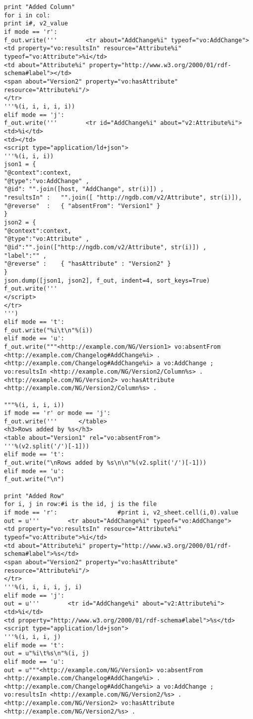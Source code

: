 \begin{verbatim}
print "Added Column"
for i in col:
print i#, v2_value
if mode == 'r':
f_out.write('''        <tr about="AddChange%i" typeof="vo:AddChange">
<td property="vo:resultsIn" resource="Attribute%i" typeof="vo:Attribute">%i</td>
<td about="Attribute%i" property="http://www.w3.org/2000/01/rdf-schema#label"></td>
<span about="Version2" property="vo:hasAttribute" resource="Attribute%i"/>
</tr>
'''%(i, i, i, i, i))
elif mode == 'j':
f_out.write('''        <tr id="AddChange%i" about="v2:Attribute%i">
<td>%i</td>
<td></td>
<script type="application/ld+json">
'''%(i, i, i))
json1 = {
"@context":context,
"@type":"vo:AddChange" ,
"@id": "".join([host, "AddChange", str(i)]) ,
"resultsIn" :   "".join([ "http://ngdb.com/v2/Attribute", str(i)]),
"@reverse"  :   { "absentFrom": "Version1" }
}
json2 = {
"@context":context,
"@type":"vo:Attribute" ,
"@id":"".join(["http://ngdb.com/v2/Attribute", str(i)]) ,
"label":"" ,
"@reverse" :    { "hasAttribute" : "Version2" }
}
json.dump([json1, json2], f_out, indent=4, sort_keys=True)
f_out.write('''
</script>
</tr>
''')
elif mode == 't':
f_out.write("%i\t\n"%(i))	
elif mode == 'u':
f_out.write("""<http://example.com/NG/Version1> vo:absentFrom <http://example.com/Changelog#AddChange%i> .
<http://example.com/Changelog#AddChange%i> a vo:AddChange ;
vo:resultsIn <http://example.com/NG/Version2/Column%s> .
<http://example.com/NG/Version2> vo:hasAttribute <http://example.com/NG/Version2/Column%s> .

"""%(i, i, i, i))
if mode == 'r' or mode == 'j':
f_out.write('''      </table>
<h3>Rows added by %s</h3>
<table about="Version1" rel="vo:absentFrom">
'''%(v2.split('/')[-1]))
elif mode == 't':
f_out.write("\nRows added by %s\n\n"%(v2.split('/')[-1]))
elif mode == 'u':
f_out.write("\n")

print "Added Row"
for i, j in row:#i is the id, j is the file
if mode == 'r':	                #print i, v2_sheet.cell(i,0).value
out = u'''        <tr about="AddChange%i" typeof="vo:AddChange">
<td property="vo:resultsIn" resource="Attribute%i" typeof="vo:Attribute">%i</td>
<td about="Attribute%i" property="http://www.w3.org/2000/01/rdf-schema#label">%s</td>
<span about="Version2" property="vo:hasAttribute" resource="Attribute%i"/>
</tr>
'''%(i, i, i, i, j, i)
elif mode == 'j':
out = u'''        <tr id="AddChange%i" about="v2:Attribute%i">
<td>%i</td>
<td property="http://www.w3.org/2000/01/rdf-schema#label">%s</td>
<script type="application/ld+json">
'''%(i, i, i, j)
elif mode == 't':
out = u"%i\t%s\n"%(i, j)
elif mode == 'u':
out = u"""<http://example.com/NG/Version1> vo:absentFrom <http://example.com/Changelog#AddChange%i> .
<http://example.com/Changelog#AddChange%i> a vo:AddChange ;
vo:resultsIn <http://example.com/NG/Version2/%s> .
<http://example.com/NG/Version2> vo:hasAttribute <http://example.com/NG/Version2/%s> .


\end{verbatim}
